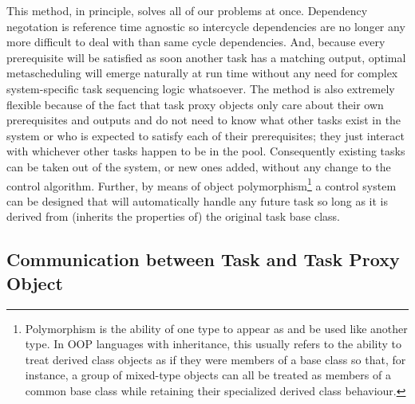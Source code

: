 \documentclass[11pt,a4paper]{article}
\begin{document}
This method, in principle, solves all of our problems at once.
Dependency negotation is reference time agnostic so intercycle
dependencies are no longer any more difficult to deal with than same
cycle dependencies. And, because every prerequisite will be satisfied
as soon another task has a matching output, optimal metascheduling will
emerge naturally at run time without any need for complex
system-specific task sequencing logic whatsoever.  The method is also
extremely flexible because of the fact that task proxy objects only care
about their own prerequisites and outputs and do not need to know what
other tasks exist in the system or who is expected to satisfy each of
their prerequisites; they just interact with whichever other tasks
happen to be in the pool.  Consequently existing tasks can be taken out
of the system, or new ones added, without any change to the control
algorithm.  Further, by means of object
polymorphism\footnote{Polymorphism is the ability of one type to appear
as and be used like another type. In OOP languages with inheritance,
this usually refers to the ability to treat derived class objects as if
they were members of a base class so that, for instance, a group of
mixed-type objects can all be treated as members of a common base class
while retaining their specialized derived class behaviour.} a control
system can be designed that will automatically handle any future task so
long as it is derived from (inherits the properties of) the original
task base class.

\label{sec-task-messaging}
\subsection{Communication between Task and Task Proxy Object}
\end{document}
